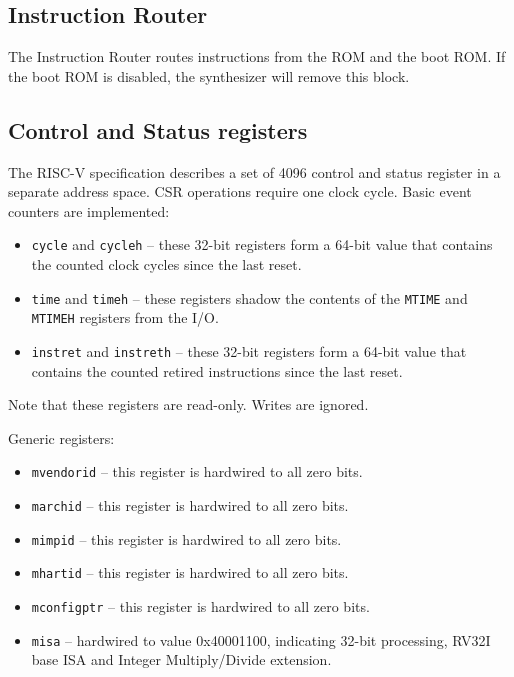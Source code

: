 \documentclass[12pt]{article}
\begin{document}
\subsection{Instruction Router}
The Instruction Router routes instructions from the ROM and the boot ROM. If the boot ROM is disabled, the synthesizer will remove this block.

\subsection{Control and Status registers}
The RISC-V specification describes a set of 4096 control and status register in a separate address space. CSR operations require one clock cycle. Basic event counters are implemented:

\begin{itemize}
\item \lstinline|cycle| and \lstinline|cycleh| -- these 32-bit registers form a 64-bit value that contains the counted clock cycles since the last reset.
\item \lstinline|time| and \lstinline|timeh| -- these registers shadow the contents of the \lstinline|MTIME| and \lstinline|MTIMEH| registers from the I/O.
\item \lstinline|instret| and \lstinline|instreth| -- these 32-bit registers form a 64-bit value that contains the counted retired instructions since the last reset.
\end{itemize}

Note that these registers are read-only. Writes are ignored. 

Generic registers:

\begin{itemize}
\item \lstinline|mvendorid| -- this register is hardwired to all zero bits.
\item \lstinline|marchid| -- this register is hardwired to all zero bits.
\item \lstinline|mimpid| -- this register is hardwired to all zero bits.
\item \lstinline|mhartid| -- this register is hardwired to all zero bits.
\item \lstinline|mconfigptr| -- this register is hardwired to all zero bits.
\item \lstinline|misa| -- hardwired to value 0x40001100, indicating 32-bit processing, RV32I base ISA and Integer Multiply/Divide extension.
\end{itemize}
\end{document}
